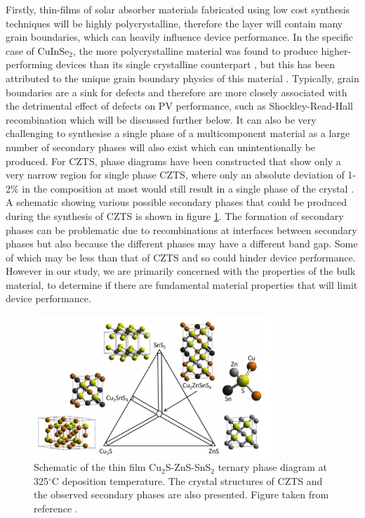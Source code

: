 Firstly, thin-films of solar absorber materials fabricated using low cost synthesis techniques will be highly polycrystalline, therefore the layer will contain many grain boundaries, which can heavily influence device performance. In the specific case of CuInSe$_2$, the more polycrystalline material was found to produce higher-performing devices than its single crystalline counterpart \cite{CIS1_3, CIS1_4}, but this has been attributed to the unique grain boundary physics of this material \cite{CIS1, CIS2}. Typically, grain boundaries are a sink for defects and therefore are more closely associated with the detrimental effect of defects on PV performance, such as Shockley-Read-Hall recombination which will be discussed further below. 
It can also be very challenging to synthesise a single phase of a multicomponent material as a large number of secondary phases will also exist which can unintentionally be produced. For CZTS, phase diagrams have been constructed that show only a very narrow region for single phase CZTS, where only an absolute deviation of 1-2$\%$ in the composition at most would still result in a single phase of the crystal \cite{SandS}. A schematic showing various possible secondary phases that could be produced during the synthesis of CZTS is shown in figure \ref{CZTS_phase_diagram}. The formation of secondary phases can be problematic due to recombinations at interfaces between secondary phases but also because the different phases may have a different band gap. Some of which may be less than that of CZTS and so could hinder device performance.
However in our study, we are primarily concerned with the properties of the bulk material, to determine if there are fundamental material properties that will limit device performance.

\begin{figure}[h!]
  \centering
    \includegraphics[width=0.8\textwidth]{figures/CZTS_phase_diagram.png}
    \caption{Schematic of the thin film
Cu$_2$S-ZnS-SnS$_2$ ternary phase diagram at 325$^{\circ}$C deposition temperature. The crystal structures of CZTS and the observed secondary phases are also presented. Figure taken from reference .}
  \label{CZTS_phase_diagram}
\end{figure}

